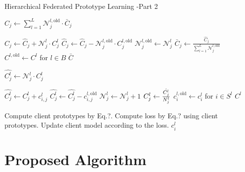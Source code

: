 \documentclass{article}
\begin{document}
\begin{algorithm}[H]
    \caption{Hierarchical Federated Prototype Learning -Part 2}
    \begin{algorithmic}[1]
        \State \( \hat{C}_{j} \gets \sum_{l=1}^{L} {\mathcal{N}_j^{l,\text{old}}} \cdot\bar{C}_{j} \) 

        \State \( \hat{C}_{j}  \gets \hat{C}_{j} + {\mathcal{N}_j^l} \cdot C^l_j \)
        \State \( \hat{C}_{j}  \gets \hat{C}_{j} - {\mathcal{N}_j^{l,\text{old}}} \cdot C_j^{l, \text{old}} \)
        \EndIf
        \State \( {\mathcal{N}_j^{l,\text{old}}} \gets \mathcal{N}_j^l \)
        \EndFor
        \State \( \bar{C}_{j} \gets \frac{\hat{C}_{j}}{\sum_{l=1}^{L} {\mathcal{N}_j^{l,\text{old}}}} \)
        \EndFor
        \State \( C^{l,\text{old}} \gets C^l \) for \( l \in B \)
        \State \Return \( \bar{C} \)
        \EndProcedure

        \State \( {\hat{C^l_j}} \gets \mathcal{N}^l_j \cdot C^l_{j} \)

        \State \( {\hat{C^l_j}}  \gets {\hat{C^l_j}} + c^l_{i,j} \)
        \State \( {\hat{C^l_j}}  \gets {\hat{C^l_j}} - c^{l,\text{old}}_{i,j}\)
        \Else
        \State \( \mathcal{N}_j^l \gets \mathcal{N}_j^l + 1 \)
        \EndIf
        \EndFor
        \State \( {C^l_j} \gets \frac{{\hat{C^l_j}}}{\mathcal\mathcal{N}_j^l} \)
        \EndFor
        \State \( c^{l,\text{old}}_i \gets c^l_i \) for \( i \in S^l \)
        \State \Return \( C^l \)
        \EndProcedure

        \State Compute client prototypes by Eq.?.
        \State Compute loss by Eq.? using client prototypes.
        \State Update client model according to the loss.
        \EndFor
        \EndFor
        \State \Return \( c^l_i \)
        \EndProcedure
    \end{algorithmic}
\end{algorithm}

\section{Proposed Algorithm}
\end{document}
